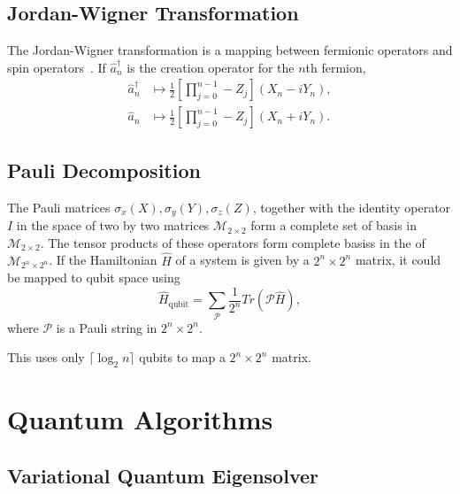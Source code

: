 \subsection{Jordan-Wigner Transformation}
\label{sub:jw}
The Jordan-Wigner transformation is a mapping between fermionic operators and spin operators~\cite{Jordan1993, Seeley2012}. 
If $ \hat a_n^{\dagger} $ is the creation operator for the $n$th fermion,
\begin{equation}
	\label{eq:jw}
	\begin{aligned}	
		\hat a^{\dagger}_n &\mapsto \frac{1}{2} \left[ \prod_{j=0}^{n-1} -Z_j \right] \left( X_n - i Y_n \right), \\
		\hat a_n &\mapsto \frac{1}{2} \left[ \prod_{j=0}^{n-1} -Z_j \right] \left( X_n + i Y_n \right). 
	\end{aligned}
\end{equation}

\subsection{Pauli Decomposition}
The Pauli matrices $\sigma_x (X), \sigma_y (Y), \sigma_z (Z)$, together with the identity operator $ I $ in the space of two by two matrices $ \mathcal{M}_{2\times 2} $ form a complete set of basis in $ \mathcal{M}_{2\times2} $. The tensor products of these operators form complete basiss in the of $ \mathcal{M}_{2^n \times 2^n} $.
If the Hamiltonian $ \hat H $ of a system is given by a $ 2^n \times 2^n $ matrix, 
it could be mapped to qubit space using 
\begin{equation}
	\label{eq:pauli-decomp}
	\hat H_{\text{qubit}} =
	\sum_{\mathcal{P}} \frac{1}{2^n} Tr{\left( \mathcal{P} \hat H \right)},
\end{equation}
where $ \mathcal{P} $ is a Pauli string in $ 2^n \times 2^n $.

This uses only $ \lceil \log_2{n} \rceil $ qubits to map a $ 2^n \times 2^n $ matrix. 


\section{Quantum Algorithms}
\label{sec:quantum_algorithms}

\subsection{Variational Quantum Eigensolver}
\label{sub:vqe}

